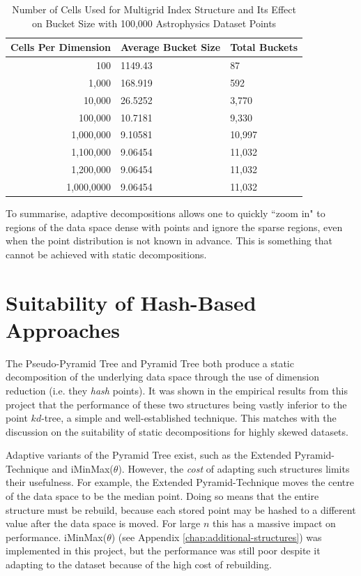 \begin{table}
	\centering
	\begin{tabular}{|r|l|l|}
	\hline
	\textbf{Cells Per Dimension} & \textbf{Average Bucket Size} & \textbf{Total Buckets} \\
	\hline
	100 & 1149.43 & 87 \\
	1,000 & 168.919 & 592 \\
	10,000 & 26.5252 & 3,770 \\
	100,000 & 10.7181 & 9,330 \\
	1,000,000 & 9.10581 & 10,997 \\
	1,100,000 & 9.06454 & 11,032 \\
	1,200,000 & 9.06454 & 11,032 \\
	1,000,0000 & 9.06454 & 11,032 \\
	\hline
	\end{tabular}
	\caption{Number of Cells Used for Multigrid Index Structure and Its Effect on Bucket Size with 100,000 Astrophysics Dataset Points}
	\label{tab:cell-size-effect}
\end{table}

To summarise, adaptive decompositions allows one to quickly ``zoom in" to regions of the data space dense with points and ignore the sparse regions, even when the point distribution is not known in advance. This is something that cannot be achieved with static decompositions.

\section{Suitability of Hash-Based Approaches}

The Pseudo-Pyramid Tree and Pyramid Tree both produce a static decomposition of the underlying data space through the use of dimension reduction (i.e. they \textit{hash} points). It was shown in the empirical results from this project that the performance of these two structures being vastly inferior to the point $kd$-tree, a simple and well-established technique. This matches with the discussion on the suitability of static decompositions for highly skewed datasets.

Adaptive variants of the Pyramid Tree exist, such as the Extended Pyramid-Technique \cite{pyramid-tree} and iMinMax($\theta$). However, the \textit{cost} of adapting such structures limits their usefulness. For example, the Extended Pyramid-Technique moves the centre of the data space to be the median point. Doing so means that the entire structure must be rebuild, because each stored point may be hashed to a different value after the data space is moved. For large $n$ this has a massive impact on performance. iMinMax($\theta$)  (see Appendix \ref{chap:additional-structures}) was implemented in this project, but the performance was still poor despite it adapting to the dataset because of the high cost of rebuilding.

